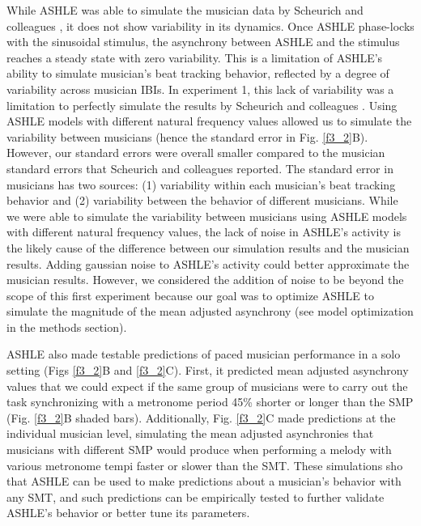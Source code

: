 \documentclass{report}
\begin{document}
While ASHLE was able to simulate the musician data by Scheurich and colleagues \cite{scheurich2018tapping}, it does not show variability in its dynamics. Once ASHLE phase-locks with the sinusoidal stimulus, the asynchrony between ASHLE and the stimulus reaches a steady state with zero variability. This is a limitation of ASHLE's ability to simulate musician's beat tracking behavior, reflected by a degree of variability across musician IBIs. In experiment 1, this lack of variability was a limitation to perfectly simulate the results by Scheurich and colleagues \cite{scheurich2018tapping}. Using ASHLE models with different natural frequency values allowed us to simulate the variability between musicians (hence the standard error in Fig.{} \ref{f3_2}B). However, our standard errors were overall smaller compared to the musician standard errors that Scheurich and colleagues \cite{scheurich2018tapping} reported. The standard error in musicians has two sources: (1) variability within each musician's beat tracking behavior and (2) variability between the behavior of different musicians. While we were able to simulate the variability between musicians using ASHLE models with different natural frequency values, the lack of noise in ASHLE's activity is the likely cause of the difference between our simulation results and the musician results. Adding gaussian noise to ASHLE's activity could better approximate the musician results. However, we considered the addition of noise to be beyond the scope of this first experiment because our goal was to optimize ASHLE to simulate the magnitude of the mean adjusted asynchrony (see model optimization in the methods section).

ASHLE also made testable predictions of paced musician performance in a solo setting (Figs \ref{f3_2}B and \ref{f3_2}C). First, it predicted mean adjusted asynchrony values that we could expect if the same group of musicians were to carry out the task synchronizing with a metronome period 45\% shorter or longer than the SMP (Fig.{} \ref{f3_2}B shaded bars). Additionally, Fig.{} \ref{f3_2}C made predictions at the individual musician level, simulating the mean adjusted asynchronies that musicians with different SMP would produce when performing a melody with various metronome tempi faster or slower than the SMT. These simulations sho that ASHLE can be used to make predictions about a musician's behavior with any SMT, and such predictions can be empirically tested to further validate ASHLE's behavior or better tune its parameters.
\end{document}
